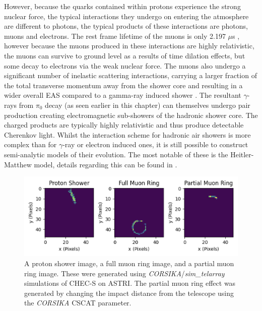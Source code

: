 However, because the quarks contained within protons experience the strong nuclear force, the typical interactions they undergo on entering the atmosphere are different to photons, the typical products of these interactions are photons, muons and electrons. The rest frame lifetime of the muons is only 2.197 $\mu$s \cite{pdg}, however because the muons produced in these interactions are highly relativistic, the muons can survive to ground level as a results of time dilation effects, but some decay to electrons via the weak nuclear force. The muons also undergo a significant number of inelastic scattering interactions, carrying a larger fraction of the total transverse momentum away from the shower core and resulting in a wider overall EAS compared to a gamma-ray induced shower \cite{tomthesis}.  The resultant $\gamma$-rays from $\pi_0$ decay (as seen earlier in this chapter) can themselves undergo pair production creating electromagnetic sub-showers of the hadronic shower core. The charged products are typically highly relativistic and thus produce detectable Cherenkov light.  Whilst the interaction scheme for hadronic air showers is more complex than for $\gamma$-ray or electron induced ones, it is still possible to construct semi-analytic models of their evolution. The most notable of these is the Heitler-Matthew model, details regarding this can be found in \cite{heitler}.
\begin{figure}[h!]
\begin{center}  

\includegraphics[width=\columnwidth]{figures/muonplot.png}
 
\caption{A proton shower image, a full muon ring image, and a partial muon ring image. These were generated using \textit{CORSIKA}/\textit{sim\_telarray} simulations of CHEC-S on ASTRI. The partial muon ring effect was generated by changing the impact distance from the telescope using the \textit{CORSIKA} CSCAT parameter.}
\label{fig:muonplot}
\end{center}
\end{figure}

